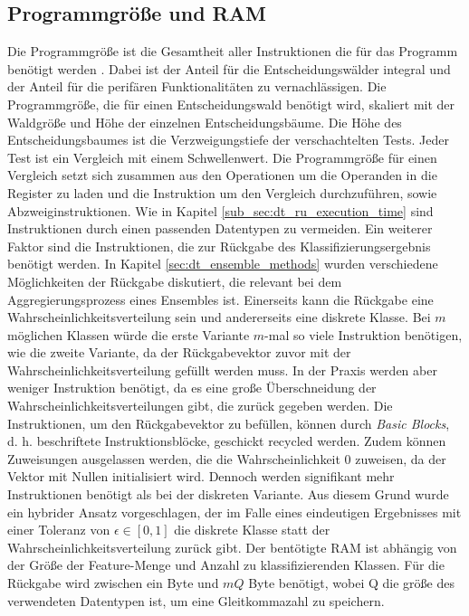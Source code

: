 \newpage
\subsection{Programmgröße und RAM}
\label{sub_sec:dt_ru_programm_size}
Die Programmgröße ist die Gesamtheit aller Instruktionen die für das Programm benötigt werden \cite{dymelThesis}.
Dabei ist der Anteil für die Entscheidungswälder integral und der Anteil für die perifären Funktionalitäten zu vernachlässigen.
Die Programmgröße, die für einen Entscheidungswald benötigt wird, skaliert mit der Waldgröße und Höhe der einzelnen Entscheidungsbäume.
\newline
\newline
Die Höhe des Entscheidungsbaumes ist die Verzweigungstiefe der verschachtelten Tests.
Jeder Test ist ein Vergleich mit einem Schwellenwert.
Die Programmgröße für einen Vergleich setzt sich zusammen aus den Operationen um die Operanden in die Register zu laden
und die Instruktion um den Vergleich durchzuführen, sowie Abzweiginstruktionen. Wie in Kapitel \ref{sub_sec:dt_ru_execution_time}
sind Instruktionen durch einen passenden Datentypen zu vermeiden.
\newline
\newline
Ein weiterer Faktor sind die Instruktionen, die zur Rückgabe des Klassifizierungsergebnis benötigt werden.
In Kapitel \ref{sec:dt_ensemble_methods} wurden verschiedene Möglichkeiten der Rückgabe diskutiert, die relevant bei dem Aggregierungsprozess eines Ensembles ist.
Einerseits kann die Rückgabe eine Wahrscheinlichkeitsverteilung sein und andererseits eine diskrete Klasse.
Bei $m$ möglichen Klassen würde die erste Variante $m$-mal so viele Instruktion benötigen, wie die zweite Variante, da der Rückgabevektor zuvor mit der Wahrscheinlichkeitsverteilung gefüllt werden muss.
In der Praxis werden aber weniger Instruktion benötigt, da es eine große Überschneidung der Wahrscheinlichkeitsverteilungen gibt, die zurück gegeben werden.
Die Instruktionen, um den Rückgabevektor zu befüllen, können durch \textit{Basic Blocks}, d. h. beschriftete Instruktionsblöcke, geschickt recycled werden.
Zudem können Zuweisungen ausgelassen werden, die die Wahrscheinlichkeit 0 zuweisen, da der Vektor mit Nullen initialisiert wird.
Dennoch werden signifikant mehr Instruktionen benötigt als bei der diskreten Variante.
Aus diesem Grund wurde ein hybrider Ansatz vorgeschlagen, der im Falle eines eindeutigen Ergebnisses mit einer Toleranz von $\epsilon\in [0, 1]$ die diskrete Klasse statt der Wahrscheinlichkeitsverteilung zurück gibt.
\newline
\newline
Der bentötigte RAM ist abhängig von der Größe der Feature-Menge und Anzahl zu klassifizierenden Klassen.
Für die Rückgabe wird zwischen ein Byte und $mQ$ Byte benötigt, wobei Q die größe des verwendeten Datentypen ist, um eine Gleitkommazahl zu speichern.